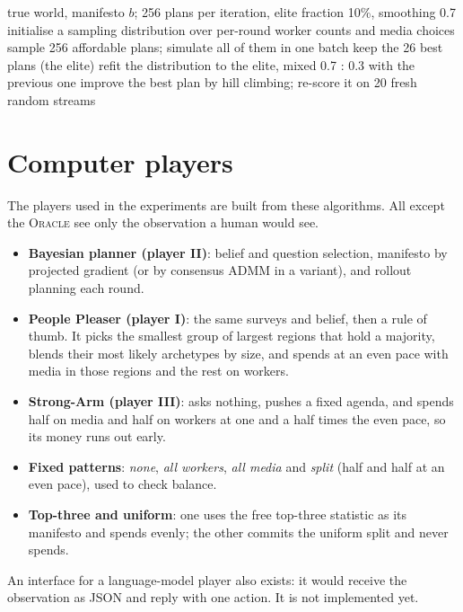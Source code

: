 \documentclass[11pt,a4paper,oneside]{report}
\newcommand{\ORACLE}{\textsc{Oracle}}
\begin{document}
\begin{algorithm}[t]
\caption{Cross-entropy plan search}\label{alg:cem}
\begin{algorithmic}[1]
\Require true world, manifesto $b$; 256 plans per iteration, elite fraction 10\%, smoothing 0.7
\State initialise a sampling distribution over per-round worker counts and media choices
  \State sample 256 affordable plans; simulate all of them in one batch
  \State keep the 26 best plans (the elite)
  \State refit the distribution to the elite, mixed 0.7 : 0.3 with the previous one
\EndFor
\State improve the best plan by hill climbing; re-score it on 20 fresh random streams
\end{algorithmic}
\end{algorithm}

\section{Computer players}

The players used in the experiments are built from these algorithms. All except the \ORACLE{} see only the
observation a human would see.
\begin{itemize}
  \item \textbf{Bayesian planner (player II)}: belief and question selection, manifesto by projected
        gradient (or by consensus ADMM in a variant), and rollout planning each round.
  \item \textbf{People Pleaser (player I)}: the same surveys and belief, then a rule of thumb. It picks the
        smallest group of largest regions that hold a majority, blends their most likely archetypes by
        size, and spends at an even pace with media in those regions and the rest on workers.
  \item \textbf{Strong-Arm (player III)}: asks nothing, pushes a fixed agenda, and spends half on media and
        half on workers at one and a half times the even pace, so its money runs out early.
  \item \textbf{Fixed patterns}: \emph{none}, \emph{all workers}, \emph{all media} and \emph{split} (half
        and half at an even pace), used to check balance.
  \item \textbf{Top-three and uniform}: one uses the free top-three statistic as its manifesto and spends
        evenly; the other commits the uniform split and never spends.
\end{itemize}
An interface for a language-model player also exists: it would receive the observation as JSON and reply
with one action. It is not implemented yet.
\end{document}
